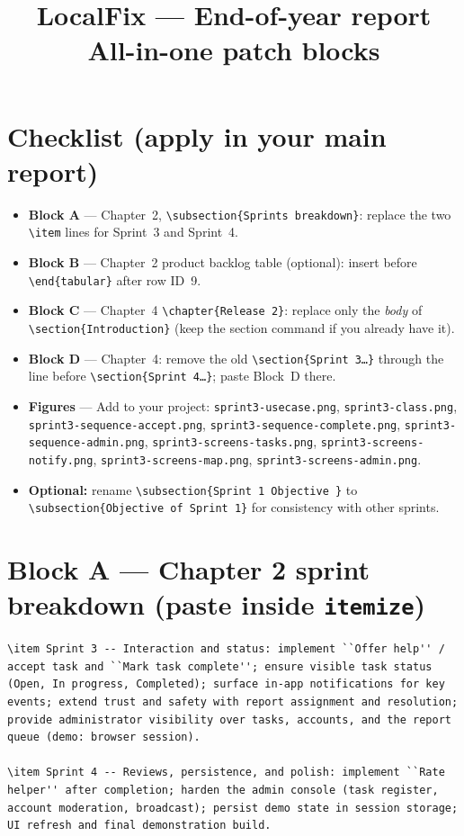 \documentclass[11pt,a4paper]{article}
\title{LocalFix --- End-of-year report\\[0.5em]\large All-in-one patch blocks}
\date{}
\author{}
\begin{document}
\maketitle

\section*{Checklist (apply in your main report)}
\begin{itemize}
	\item \textbf{Block A} --- Chapter~2, \texttt{\textbackslash subsection\{Sprints breakdown\}}: replace the two \texttt{\textbackslash item} lines for Sprint~3 and Sprint~4.
	\item \textbf{Block B} --- Chapter~2 product backlog table (optional): insert before \texttt{\textbackslash end\{tabular\}} after row ID~9.
	\item \textbf{Block C} --- Chapter~4 \texttt{\textbackslash chapter\{Release 2\}}: replace only the \emph{body} of \texttt{\textbackslash section\{Introduction\}} (keep the section command if you already have it).
	\item \textbf{Block D} --- Chapter~4: remove the old \texttt{\textbackslash section\{Sprint 3\ldots\}} through the line before \texttt{\textbackslash section\{Sprint 4\ldots\}}; paste Block~D there.
	\item \textbf{Figures} --- Add to your project: \texttt{sprint3-usecase.png}, \texttt{sprint3-class.png}, \texttt{sprint3-sequence-accept.png}, \texttt{sprint3-sequence-complete.png}, \texttt{sprint3-sequence-admin.png}, \texttt{sprint3-screens-tasks.png}, \texttt{sprint3-screens-notify.png}, \texttt{sprint3-screens-map.png}, \texttt{sprint3-screens-admin.png}.
	\item \textbf{Optional:} rename \texttt{\textbackslash subsection\{Sprint 1 Objective \}} to \texttt{\textbackslash subsection\{Objective of Sprint 1\}} for consistency with other sprints.
\end{itemize}

\section{Block A --- Chapter 2 sprint breakdown (paste inside \texttt{itemize})}
\begin{verbatim}
\item Sprint 3 -- Interaction and status: implement ``Offer help'' / accept task and ``Mark task complete''; ensure visible task status (Open, In progress, Completed); surface in-app notifications for key events; extend trust and safety with report assignment and resolution; provide administrator visibility over tasks, accounts, and the report queue (demo: browser session).

\item Sprint 4 -- Reviews, persistence, and polish: implement ``Rate helper'' after completion; harden the admin console (task register, account moderation, broadcast); persist demo state in session storage; UI refresh and final demonstration build.
\end{verbatim}
\end{document}

